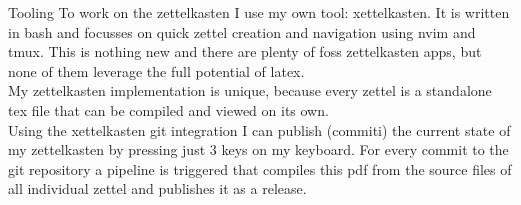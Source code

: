 \documentclass[class=article, crop=false]{standalone}
\begin{document}
\begin{zettel}{Tooling}
    To work on the zettelkasten I use my own tool: xettelkasten. It is written in bash and focusses on quick zettel creation and navigation using nvim and tmux. This is nothing new and there are plenty of foss zettelkasten apps, but none of them leverage the full potential of latex.\\

    My zettelkasten implementation is unique, because every zettel is a standalone tex file that can be compiled and viewed on its own.\\

    Using the xettelkasten git integration I can publish (commiti) the current state of my zettelkasten by pressing just 3 keys on my keyboard. For every commit to the git repository a pipeline is triggered that compiles this pdf from the source files of all individual zettel and publishes it as a release.
\end{zettel}
\end{document}
